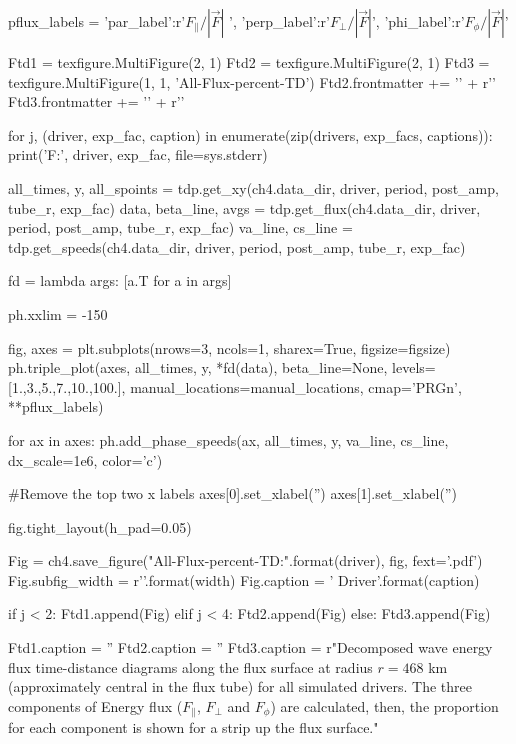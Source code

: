 \begin{pycode}[chapter4]
pflux_labels = {'par_label':r'$F_\parallel / |\vec{F}|$ ', 
                'perp_label':r'$F_\perp / |\vec{F}|$',
                'phi_label':r'$F_\phi / |\vec{F}|$'}

Ftd1 = texfigure.MultiFigure(2, 1)
Ftd2 = texfigure.MultiFigure(2, 1)
Ftd3 = texfigure.MultiFigure(1, 1, 'All-Flux-percent-TD')
Ftd2.frontmatter += '\n' + r'\ContinuedFloat'
Ftd3.frontmatter += '\n' + r'\ContinuedFloat'

for j, (driver, exp_fac, caption) in enumerate(zip(drivers, exp_facs, captions)):
    print('F:', driver, exp_fac, file=sys.stderr)
    
    
    all_times, y, all_spoints = tdp.get_xy(ch4.data_dir, driver, period, post_amp, tube_r, exp_fac)
    data, beta_line, avgs = tdp.get_flux(ch4.data_dir, driver, period, post_amp, tube_r, exp_fac)
    va_line, cs_line = tdp.get_speeds(ch4.data_dir, driver, period, post_amp, tube_r, exp_fac)
    
    
    fd = lambda args: [a.T for a in args]
    
    ph.xxlim = -150
    
    fig, axes = plt.subplots(nrows=3, ncols=1, sharex=True, figsize=figsize)
    ph.triple_plot(axes, all_times, y, *fd(data), beta_line=None,
    levels=[1.,3.,5.,7.,10.,100.], manual_locations=manual_locations, cmap='PRGn', **pflux_labels)
    
    for ax in axes:
        ph.add_phase_speeds(ax, all_times, y, va_line, cs_line, dx_scale=1e6, color='c')
    
    #Remove the top two x labels
    axes[0].set_xlabel('')
    axes[1].set_xlabel('')
    
    fig.tight_layout(h_pad=0.05)
    
    Fig = ch4.save_figure("All-Flux-percent-TD:{}".format(driver), fig, fext='.pdf')
    Fig.subfig_width = r'{}\columnwidth'.format(width)
    Fig.caption = '{} Driver'.format(caption)
    
    if j < 2:
        Ftd1.append(Fig)
    elif j < 4:
        Ftd2.append(Fig)
    else:
        Ftd3.append(Fig)


Ftd1.caption = ''
Ftd2.caption = ''
Ftd3.caption = r"Decomposed wave energy flux time-distance diagrams along the flux surface at radius $r = 468$ km (approximately central in the flux tube) for all simulated drivers. The three components of Energy flux ($F_\parallel$, $F_\perp$ and $F_\phi$) are calculated, then, the proportion for each component is shown for a strip up the flux surface."
\end{pycode}

